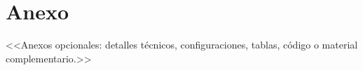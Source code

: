 \chapter{Anexo} \label{chp:anexo}

<<Anexos opcionales: detalles técnicos, configuraciones, tablas, código o material complementario.>>
